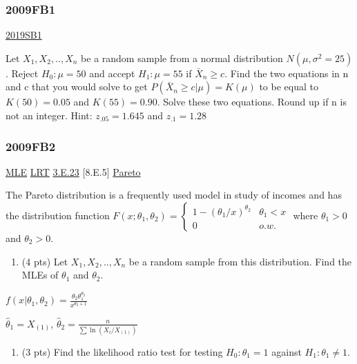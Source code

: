 \documentclass[10pt,twocolumn,portrait]{article}
\providecommand{\tightlist}{%
  \setlength{\itemsep}{0pt}\setlength{\parskip}{0pt}}
\begin{document}
\hypertarget{fb1}{%
\subsubsection{2009FB1}\label{fb1}}

\protect\hyperlink{sb1-3}{2019SB1}

Let \(X_1,X_2,..,X_n\) be a random sample from a normal distribution
\(N(\mu,\sigma^2=25)\). Reject \(H_0:\mu=50\) and accept \(H_1:\mu=55\)
if \(\bar X_n\ge c\). Find the two equations in n and c that you would
solve to get \(P(\bar X_n\ge c|\mu)=K(\mu)\) to be equal to
\(K(50)=0.05\) and \(K(55)=0.90\). Solve these two equations. Round up
if n is not an integer. Hint: \(z_{.05}=1.645\) and \(z_{.1}=1.28\)

\hypertarget{fb2}{%
\subsubsection{2009FB2}\label{fb2}}

\protect\hyperlink{MLE}{MLE} \protect\hyperlink{LRT}{LRT}
\protect\hyperlink{Pareto}{3.E.23} {[}8.E.5{]}
\protect\hyperlink{Pareto}{Pareto}

The Pareto distribution is a frequently used model in study of incomes
and has the distribution function
\(F(x;\theta_1,\theta_2)=\begin{cases}1-(\theta_1/x)^{\theta_2}& \theta_1<x\\0& o.w.\end{cases}\)
where \(\theta_1>0\) and \(\theta_2>0\).

\begin{enumerate}
\def\labelenumi{(\alph{enumi})}
\tightlist
\item
  (4 pts) Let \(X_1,X_2,..,X_n\) be a random sample from this
  distribution. Find the MLEs of \(\theta_1\) and \(\theta_2\).
\end{enumerate}

\(f(x|\theta_1,\theta_2)=\frac{\theta_2\theta_1^{\theta_2}}{x^{\theta_2+1}}\)

\(\hat\theta_1=X_{(1)}\),
\(\hat\theta_2=\frac{n}{\sum\ln(X_i/X_{(1)})}\)

\begin{enumerate}
\def\labelenumi{(\alph{enumi})}
\setcounter{enumi}{1}
\tightlist
\item
  (3 pts) Find the likelihood ratio test for testing \(H_0:\theta_1=1\)
  against \(H_1:\theta_1\neq1\).
\end{enumerate}
\end{document}
